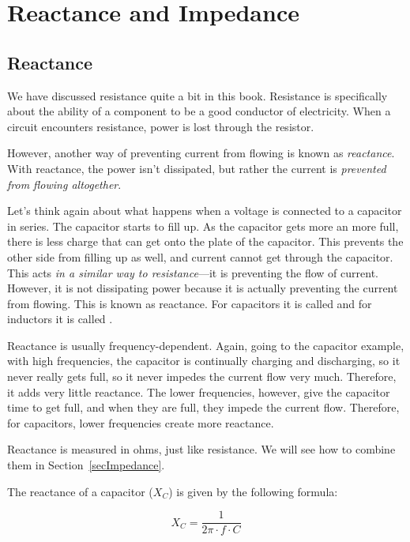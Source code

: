 \chapter{Reactance and Impedance}
\label{chapImpedance}

\section{Reactance}

We have discussed resistance quite a bit in this book.  
Resistance is specifically about the ability of a component to be a good conductor of electricity.
When a circuit encounters resistance, power is lost through the resistor.

However, another way of preventing current from flowing is known as \emph{reactance}.
With reactance, the power isn't dissipated, but rather the current is \emph{prevented from flowing altogether}.

Let's think again about what happens when a voltage is connected to a capacitor in series.
The capacitor starts to fill up.
As the capacitor gets more an more full, there is less charge that can get onto the plate of the capacitor.
This prevents the other side from filling up as well, and current cannot get through the capacitor.
This acts \emph{in a similar way to resistance}---it is preventing the flow of current.
However, it is not dissipating power because it is actually preventing the current from flowing.
This is known as reactance.
For capacitors it is called  and for inductors it is called .

Reactance is usually frequency-dependent.
Again, going to the capacitor example, with high frequencies, the capacitor is continually charging and discharging, so it never really gets full, so it never impedes the current flow very much.
Therefore, it adds very little reactance.
The lower frequencies, however, give the capacitor time to get full, and when they are full, they impede the current flow.
Therefore, for capacitors, lower frequencies create more reactance.

Reactance is measured in ohms, just like resistance.  
We will see how to combine them in Section~\ref{secImpedance}.

The reactance of a capacitor ($X_C$) is given by the following formula:

\begin{equation}
\label{eqCapReactance}
X_C = \frac{1}{2\pi\cdot f\cdot C}
\end{equation}

